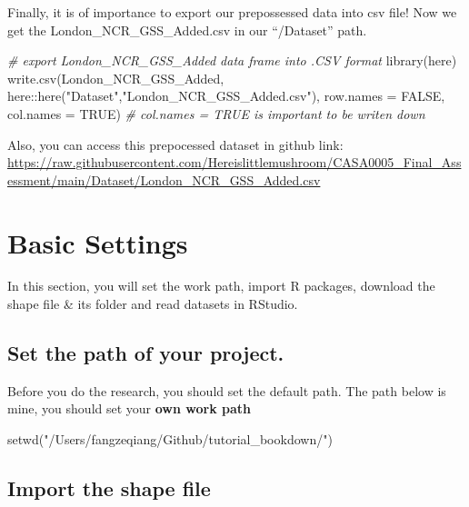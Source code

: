 \documentclass[
]{book}
\newenvironment{Shaded}{\begin{snugshade}}{\end{snugshade}}
\newcommand{\AttributeTok}[1]{\textcolor[rgb]{0.77,0.63,0.00}{#1}}
\newcommand{\CommentTok}[1]{\textcolor[rgb]{0.56,0.35,0.01}{\textit{#1}}}
\newcommand{\ConstantTok}[1]{\textcolor[rgb]{0.00,0.00,0.00}{#1}}
\newcommand{\FunctionTok}[1]{\textcolor[rgb]{0.00,0.00,0.00}{#1}}
\newcommand{\NormalTok}[1]{#1}
\newcommand{\SpecialCharTok}[1]{\textcolor[rgb]{0.00,0.00,0.00}{#1}}
\newcommand{\StringTok}[1]{\textcolor[rgb]{0.31,0.60,0.02}{#1}}
\begin{document}
Finally, it is of importance to export our prepossessed data into csv file! Now we get the London\_NCR\_GSS\_Added.csv in our ``/Dataset'' path.

\begin{Shaded}
\begin{Highlighting}[]
\CommentTok{\# export London\_NCR\_GSS\_Added data frame into .CSV format}
\FunctionTok{library}\NormalTok{(here)}
\FunctionTok{write.csv}\NormalTok{(London\_NCR\_GSS\_Added, here}\SpecialCharTok{::}\FunctionTok{here}\NormalTok{(}\StringTok{"Dataset"}\NormalTok{,}\StringTok{"London\_NCR\_GSS\_Added.csv"}\NormalTok{), }\AttributeTok{row.names =} \ConstantTok{FALSE}\NormalTok{, }\AttributeTok{col.names =} \ConstantTok{TRUE}\NormalTok{)}
\CommentTok{\# \textasciigrave{}col.names = TRUE\textasciigrave{} is important to be writen down}
\end{Highlighting}
\end{Shaded}

Also, you can access this prepocessed dataset in github link:
\url{https://raw.githubusercontent.com/Hereislittlemushroom/CASA0005_Final_Assessment/main/Dataset/London_NCR_GSS_Added.csv}

\hypertarget{basic-settings}{%
\chapter{Basic Settings}\label{basic-settings}}

In this section, you will set the work path, import R packages, download the shape file \& its folder and read datasets in RStudio.

\hypertarget{set-the-path-of-your-project.}{%
\section{Set the path of your project.}\label{set-the-path-of-your-project.}}

Before you do the research, you should set the default path. The path below is mine, you should set your \textbf{own work path}

\begin{Shaded}
\begin{Highlighting}[]
\FunctionTok{setwd}\NormalTok{(}\StringTok{"/Users/fangzeqiang/Github/tutorial\_bookdown/"}\NormalTok{)}
\end{Highlighting}
\end{Shaded}

\hypertarget{import-the-shape-file}{%
\section{Import the shape file}\label{import-the-shape-file}}
\end{document}
